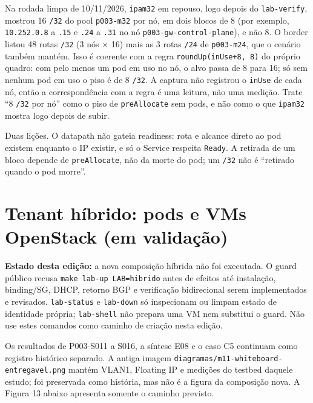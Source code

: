 \documentclass[12pt,openany,oneside,a4paper,chapter=TITLE,english,brazil]{abntex2}
\begin{document}
Na rodada limpa de 10/11/2026, \texttt{ipam32} em repouso, logo depois do \texttt{lab-{}\allowbreak{}verify},
mostrou 16 \texttt{/\allowbreak{}32} do pool \texttt{p003-{}\allowbreak{}m32} por nó, em dois blocos de 8 (por exemplo,
\texttt{10.\allowbreak{}252.\allowbreak{}0.\allowbreak{}8} a \texttt{.\allowbreak{}15} e \texttt{.\allowbreak{}24} a \texttt{.\allowbreak{}31} no nó \texttt{p003-{}\allowbreak{}gw-{}\allowbreak{}control-{}\allowbreak{}plane}), e não 8. O
border listou 48 rotas \texttt{/\allowbreak{}32} (3 nós × 16) mais as 3 rotas \texttt{/\allowbreak{}24} de \texttt{p003-{}\allowbreak{}m24},
que o cenário também mantém. Isso é coerente com a regra \texttt{round\allowbreak{}Up(\allowbreak{}in\allowbreak{}Use+8,\allowbreak{} 8)}
do próprio quadro: com pelo menos um pod em uso no nó, o alvo passa de 8 para
16; só sem nenhum pod em uso o piso é de 8 \texttt{/\allowbreak{}32}. A captura não registrou o
\texttt{in\allowbreak{}Use} de cada nó, então a correspondência com a regra é uma leitura, não uma
medição. Trate ``8 \texttt{/\allowbreak{}32} por nó'' como o piso de \texttt{pre\allowbreak{}Allocate} sem pods, e não
como o que \texttt{ipam32} mostra logo depois de subir.

Duas lições. O datapath não gateia readiness: rota e alcance direto ao pod
existem enquanto o IP existir, e só o Service respeita \texttt{Ready}. A retirada de
um bloco depende de \texttt{pre\allowbreak{}Allocate}, não da morte do pod; um \texttt{/\allowbreak{}32} não é
``retirado quando o pod morre''.

\chapter{Tenant híbrido: pods e VMs OpenStack (em validação)}\label{tenant-huxedbrido-pods-e-vms-openstack-em-validauxe7uxe3o}

\textbf{Estado desta edição:} a nova composição híbrida não foi executada. O guard
público recusa \texttt{make lab-{}\allowbreak{}up LAB=\allowbreak{}hibrido} antes de efeitos até instalação,
binding/SG, DHCP, retorno BGP e verificação bidirecional serem implementados e
revisados. \texttt{lab-{}\allowbreak{}status} e \texttt{lab-{}\allowbreak{}down} só inspecionam ou limpam estado de
identidade própria; \texttt{lab-{}\allowbreak{}shell} não prepara uma VM nem substitui o guard. Não
use estes comandos como caminho de criação nesta edição.

Os resultados de P003-S011 a S016, a síntese E08
e o caso C5 continuam como registro
histórico separado. A antiga imagem
\texttt{diagramas/\allowbreak{}m11-{}\allowbreak{}whiteboard-{}\allowbreak{}entregavel.\allowbreak{}png} mantém VLAN1, Floating IP e medições
do testbed daquele estudo; foi preservada como história, mas não é a figura da
composição nova. A Figura 13 abaixo apresenta somente o caminho previsto.
\end{document}
